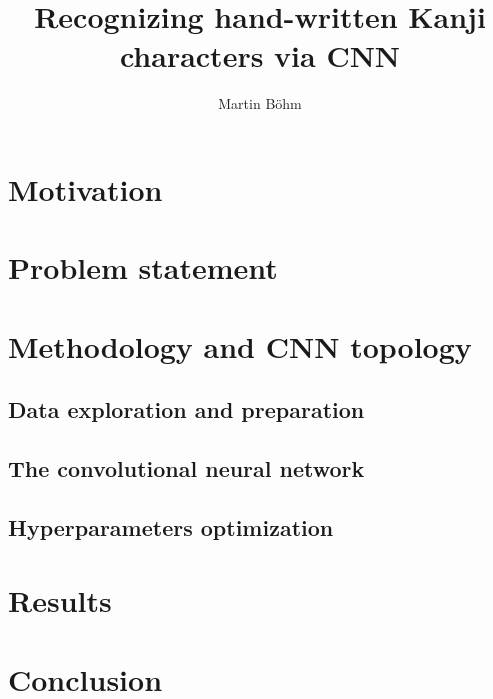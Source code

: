\documentclass[
    ngerman,american
    ]{article}
\title{Recognizing hand-written Kanji characters via CNN}
\author{
        Martin Böhm
        }
\begin{document}
      \maketitle
        \begin{abstract}

           

        \end{abstract}
        
        \section{Motivation}
        \section{Problem statement}
        \section{Methodology and CNN topology}
        \subsection{Data exploration and preparation}
        \subsection{The convolutional neural network}
        \subsection{Hyperparameters optimization}
        \section{Results}
        \section{Conclusion}
           
            
      \printbibliography
    
\end{document}
